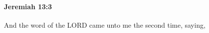
		\paragraph{Jeremiah 13:3} %
			\label{JEREMIAH-13-3}

			And the word of the LORD came unto me the second time, saying,


